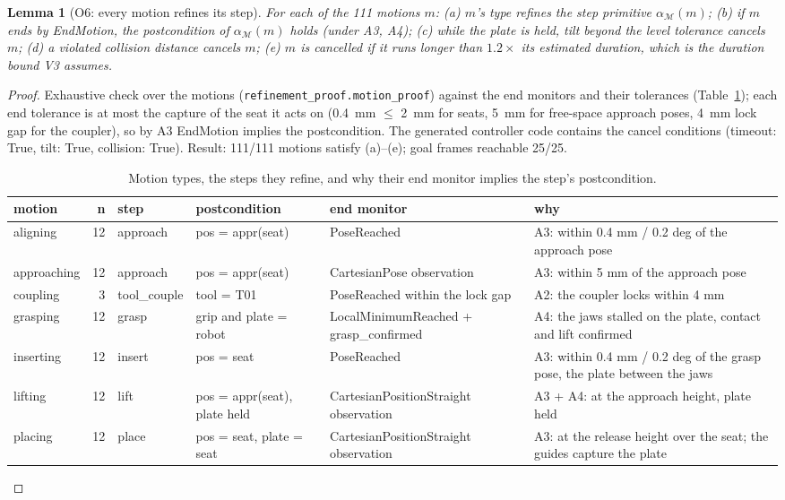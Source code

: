 \documentclass[10pt,a4paper]{article}
\theoremstyle{plain}\newtheorem{theorem}{Theorem}\newtheorem{lemma}{Lemma}\newtheorem{corollary}{Corollary}
\theoremstyle{definition}\newtheorem{definition}{Definition}\newtheorem{assumption}{Assumption}
\theoremstyle{remark}\newtheorem*{remark}{Remark}
\newcommand{\M}{\mathcal{M}}\newcommand{\Pl}{\mathcal{P}}\newcommand{\Lp}{\mathcal{L}}\newcommand{\C}{\mathcal{C}}
\begin{document}
\begin{lemma}[O6: every motion refines its step]\label{lem:motion}
For each of the 111 motions $m$: (a) $m$'s type refines the step primitive $\alpha_{\M}(m)$;
(b) if $m$ ends by EndMotion, the postcondition of $\alpha_{\M}(m)$ holds (under A3, A4); (c) while the plate is held,
tilt beyond the level tolerance cancels $m$; (d) a violated collision distance cancels $m$; (e) $m$ is cancelled if it
runs longer than $1.2\times$ its estimated duration, which is the duration bound V3 assumes.
\end{lemma}
\begin{proof}
Exhaustive check over the motions (\texttt{refinement\_proof.motion\_proof}) against the end monitors and their
tolerances (Table~\ref{tab:post}); each end tolerance is at most the capture of the seat it acts on (0.4~mm $\le$ 2~mm
for seats, 5~mm for free-space approach poses, 4~mm lock gap for the coupler), so by A3 EndMotion implies the
postcondition. The generated controller code contains the cancel conditions (timeout: True, tilt: True, collision: True). Result: 111/111 motions
satisfy (a)--(e); goal frames reachable 25/25.
\begin{table}[h]\centering\footnotesize\caption{Motion types, the steps they refine, and why their end monitor implies
the step's postcondition.}\label{tab:post}
\begin{tabularx}{\linewidth}{@{}lrllXX@{}}\toprule motion & n & step & postcondition & end monitor & why \\\midrule
aligning & 12 & approach & pos = appr(seat) & PoseReached & A3: within 0.4 mm / 0.2 deg of the approach pose \\
approaching & 12 & approach & pos = appr(seat) & CartesianPose observation & A3: within 5 mm of the approach pose \\
coupling & 3 & tool\_couple & tool = T01 & PoseReached within the lock gap & A2: the coupler locks within 4 mm \\
grasping & 12 & grasp & grip and plate = robot & LocalMinimumReached + grasp\_confirmed & A4: the jaws stalled on the plate, contact and lift confirmed \\
inserting & 12 & insert & pos = seat & PoseReached & A3: within 0.4 mm / 0.2 deg of the grasp pose, the plate between the jaws \\
lifting & 12 & lift & pos = appr(seat), plate held & CartesianPositionStraight observation & A3 + A4: at the approach height, plate held \\
placing & 12 & place & pos = seat, plate = seat & CartesianPositionStraight observation & A3: at the release height over the seat; the guides capture the plate \\

\end{tabularx}
\end{table}
\end{proof}
\end{document}

